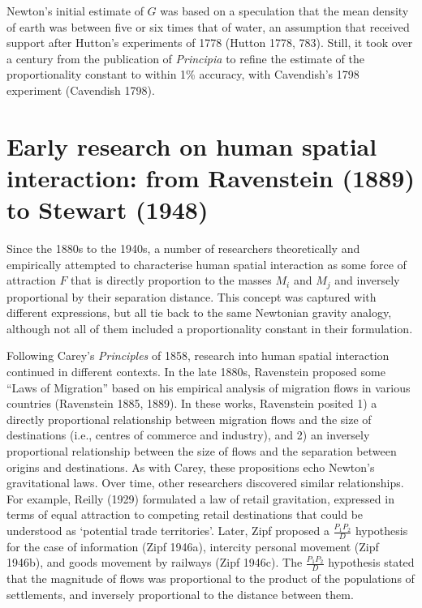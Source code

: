 \documentclass[
]{article}
\begin{document}
Newton's initial estimate of \(G\) was based on a speculation that the
mean density of earth was between five or six times that of water, an
assumption that received support after Hutton's experiments of 1778
(Hutton 1778, 783). Still, it took over a century from the publication
of \emph{Principia} to refine the estimate of the proportionality
constant to within 1\% accuracy, with Cavendish's 1798 experiment
(Cavendish 1798).

\section{Early research on human spatial interaction: from Ravenstein
(1889) to Stewart
(1948)}\label{early-research-on-human-spatial-interaction-from-ravenstein-1889-to-stewart-1948}

Since the 1880s to the 1940s, a number of researchers theoretically and
empirically attempted to characterise human spatial interaction as some
force of attraction \(F\) that is directly proportion to the masses
\(M_i\) and \(M_j\) and inversely proportional by their separation
distance. This concept was captured with different expressions, but all
tie back to the same Newtonian gravity analogy, although not all of them
included a proportionality constant in their formulation.

Following Carey's \emph{Principles} of 1858, research into human spatial
interaction continued in different contexts. In the late 1880s,
Ravenstein proposed some ``Laws of Migration'' based on his empirical
analysis of migration flows in various countries (Ravenstein 1885,
1889). In these works, Ravenstein posited 1) a directly proportional
relationship between migration flows and the size of destinations (i.e.,
centres of commerce and industry), and 2) an inversely proportional
relationship between the size of flows and the separation between
origins and destinations. As with Carey, these propositions echo
Newton's gravitational laws. Over time, other researchers discovered
similar relationships. For example, Reilly (1929) formulated a law of
retail gravitation, expressed in terms of equal attraction to competing
retail destinations that could be understood as `potential trade
territories'. Later, Zipf proposed a \(\frac{P_1P_2}{D}\) hypothesis for
the case of information (Zipf 1946a), intercity personal movement (Zipf
1946b), and goods movement by railways (Zipf 1946c). The
\(\frac{P_1P_2}{D}\) hypothesis stated that the magnitude of flows was
proportional to the product of the populations of settlements, and
inversely proportional to the distance between them.
\end{document}
